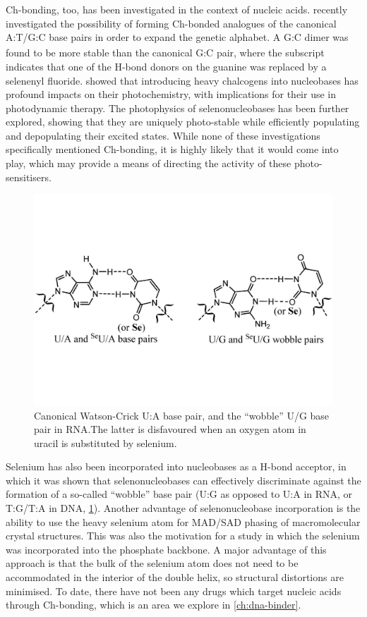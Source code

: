 \begin{refsection}
Ch-bonding, too, has been investigated in the context of nucleic acids.
 recently investigated the possibility of forming Ch-bonded analogues of the canonical A:T/G:C base pairs in order to expand the genetic alphabet.\autocite{Sharma2020}
A G\textsubscript{}:C dimer was found to be more stable than the canonical G:C pair, where the  subscript indicates that one of the H-bond donors on the guanine was replaced by a selenenyl fluoride.
 showed that introducing heavy chalcogens into nucleobases has profound impacts on their photochemistry, with implications for their use in photodynamic therapy.\autocite{Farrell2018}
The photophysics of selenonucleobases has been further explored, showing that they are uniquely photo-stable while efficiently populating and depopulating their excited states.\autocite{Mai2019,Peng2020,Fang2019,Uleany2020}
While none of these investigations specifically mentioned Ch-bonding, it is highly likely that it would come into play, which may provide a means of directing the activity of these photo-sensitisers.

\begin{figure}
    \centering
    \includegraphics[width=0.6\linewidth]{Figures/wobble-bp.pdf}
    \caption[Canonical Watson-Crick U/A base pair, and the ``wobble'' U:G base pair in RNA.]{Canonical Watson-Crick U:A base pair, and the ``wobble'' U/G base pair in RNA.\@ The latter is disfavoured when an oxygen atom in uracil is substituted by selenium.}\label{fig:wobble-bp}
\end{figure}

Selenium has also been incorporated into nucleobases as a H-bond acceptor, in which it was shown that selenonucleobases can effectively discriminate against the formation of a so-called ``wobble'' base pair (U:G as opposed to U:A in RNA, or T:G/T:A in DNA, \cref{fig:wobble-bp}).\autocite{Hassan2010,Sun2012}
Another advantage of selenonucleobase incorporation is the ability to use the heavy selenium atom for MAD/SAD phasing of macromolecular crystal structures.\autocite{Salon2007}
This was also the motivation for a \citeyear{Conlon2019} study in which the selenium was incorporated into the phosphate backbone.\autocite{Conlon2019}
A major advantage of this approach is that the bulk of the selenium atom does not need to be accommodated in the interior of the double helix, so structural distortions are minimised.
To date, there have not been any drugs which target nucleic acids through Ch-bonding, which is an area we explore in \cref{ch:dna-binder}.


\end{refsection}
